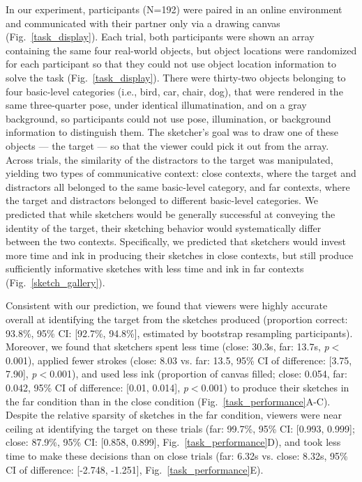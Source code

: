\documentclass[9pt,twocolumn,twoside]{pnas-new}
\begin{document}
In our experiment, participants (N=192) were paired in an online environment and communicated with their partner only via a drawing canvas (Fig.~\ref{task_display}). 
Each trial, both participants were shown an array containing the same four real-world objects, but object locations were randomized for each participant so that they could not use object location information to solve the task (Fig.~\ref{task_display}). 
There were thirty-two objects belonging to four basic-level categories (i.e., bird, car, chair, dog), that were rendered in the same three-quarter pose, under identical illumatination, and on a gray background, so participants could not use pose, illumination, or background information to distinguish them. 
The sketcher's goal was to draw one of these objects --- the target --- so that the viewer could pick it out from the array. 
Across trials, the similarity of the distractors to the target was manipulated, yielding two types of communicative context: close contexts, where the target and distractors all belonged to the same basic-level category, and far contexts, where the target and distractors belonged to different basic-level categories. 
We predicted that while sketchers would be generally successful at conveying the identity of the target, their sketching behavior would systematically differ between the two contexts. 
Specifically, we predicted that sketchers would invest more time and ink in producing their sketches in close contexts, but still produce sufficiently informative sketches with less time and ink in far contexts (Fig.~\ref{sketch_gallery}). 


Consistent with our prediction, we found that viewers were highly accurate overall at identifying the target from the sketches produced (proportion correct: 93.8\%, 95\% CI: [92.7\%, 94.8\%], estimated by bootstrap resampling participants). 
Moreover, we found that sketchers spent less time (close: 30.3s, far: 13.7s, \textit{p}$<$0.001), applied fewer strokes (close: 8.03 vs. far: 13.5, 95\% CI of difference: [3.75, 7.90], \textit{p}$<$0.001), and used less ink (proportion of canvas filled; close: 0.054, far: 0.042, 95\% CI of difference: [0.01, 0.014], \textit{p}$<$0.001) to produce their sketches in the far condition than in the close condition (Fig.~\ref{task_performance}A-C). 
Despite the relative sparsity of sketches in the far condition, viewers were near ceiling at identifying the target on these trials (far: 99.7\%, 95\% CI: [0.993, 0.999]; close: 87.9\%, 95\% CI: [0.858, 0.899], Fig.~\ref{task_performance}D), and took less time to make these decisions than on close trials (far: 6.32s vs. close: 8.32s, 95\% CI of difference: [-2.748, -1.251], Fig.~\ref{task_performance}E).
\end{document}
